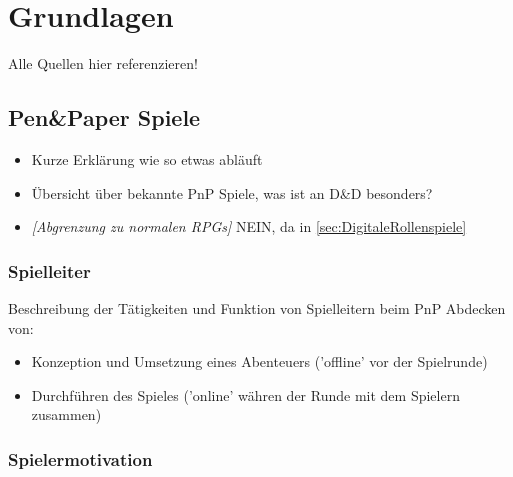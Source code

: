 \chapter{Grundlagen}
\label{background}

Alle Quellen hier referenzieren!




\section{Pen\&Paper Spiele}
\label{sec:PenPaperSpiele}

\begin{itemize}
	\item Kurze Erklärung wie so etwas abläuft
	\item Übersicht über bekannte PnP Spiele, was ist an D\&D besonders?
	\item \textit{[Abgrenzung zu normalen RPGs]} NEIN, da in \ref{sec:DigitaleRollenspiele}
\end{itemize}


\subsection{Spielleiter}
\label{sec:Spielleiter}
Beschreibung der Tätigkeiten und Funktion von Spielleitern beim PnP\newline
Abdecken von:
\begin{itemize}
	\item Konzeption und Umsetzung eines Abenteuers ('offline' vor der Spielrunde)
	\item Durchführen des Spieles ('online' währen der Runde mit dem Spielern zusammen)
\end{itemize}


\subsection{Spielermotivation}
\label{sec:Spielermotivation}

